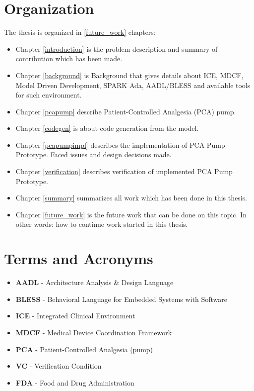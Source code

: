 \section{Organization}
\label{introduction:organization}
The thesis is organized in \ref{future_work} chapters:
\begin{itemize}
	\item Chapter \ref{introduction} is the problem description and summary of contribution which has been made. 
	\item Chapter \ref{background} is Background that gives details about ICE, MDCF, Model Driven Development, SPARK Ada, AADL/BLESS and available tools for such environment. 
	\item Chapter \ref{pcapump} describe Patient-Controlled Analgesia (PCA) pump.
	\item Chapter \ref{codegen} is about code generation from the model. 
	\item Chapter \ref{pcapumpimpl} describes the implementation of PCA Pump Prototype. Faced issues and design decisions made.
	\item Chapter \ref{verification} describes verification of implemented PCA Pump Prototype. 
	\item Chapter \ref{summary} summarizes all work which has been done in this thesis. 
	\item Chapter \ref{future_work} is the future work that can be done on this topic. In other words: how to continue work started in this thesis.
\end{itemize}


\section{Terms and Acronyms}
\label{introduction:terms}

\begin{itemize}
	\item \textbf{AADL} - Architecture Analysis \& Design Language
	\item \textbf{BLESS} - Behavioral Language for Embedded Systems with Software
	\item \textbf{ICE} - Integrated Clinical Environment
	\item \textbf{MDCF} - Medical Device Coordination Framework
	\item \textbf{PCA} - Patient-Controlled Analgesia (pump)
	\item \textbf{VC} - Verification Condition
	\item \textbf{FDA} - Food and Drug Administration
\end{itemize}
